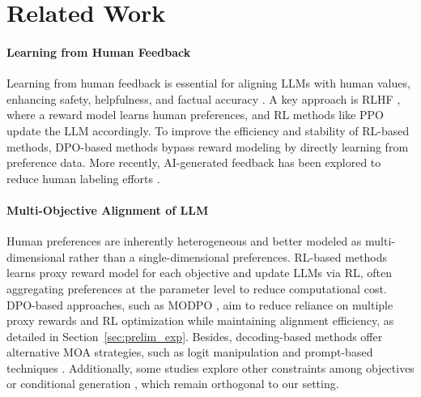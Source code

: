 \section{Related Work}

\paragraph{Learning from Human Feedback}
Learning from human feedback is essential for aligning LLMs with human values, enhancing safety, helpfulness, and factual accuracy \cite{DBLP:conf/nips/JiLDPZB0SW023, DBLP:conf/naacl/WangDZASEDSKSK24, DBLP:conf/nips/LinGOXLY024, DBLP:conf/icml/CuiY0YH0NXXL0024}. A key approach is RLHF \cite{DBLP:conf/nips/Ouyang0JAWMZASR22, DBLP:conf/nips/StiennonO0ZLVRA20, DBLP:journals/corr/abs-2204-05862, DBLP:journals/corr/abs-2307-09288}, where a reward model learns human preferences, and RL methods like PPO \cite{DBLP:journals/corr/SchulmanWDRK17} update the LLM accordingly. To improve the efficiency and stability of RL-based methods, DPO-based methods \cite{DBLP:conf/nips/RafailovSMMEF23, DBLP:journals/corr/abs-2402-01306, DBLP:conf/iclr/WangJYLC24, DBLP:conf/aistats/AzarGPMRVC24} bypass reward modeling by directly learning from preference data. More recently, AI-generated feedback has been explored to reduce human labeling efforts \cite{DBLP:conf/icml/0001PMMFLBHCRP24, DBLP:journals/corr/abs-2411-16646}.


\paragraph{Multi-Objective Alignment of LLM}
Human preferences are inherently heterogeneous and better modeled as multi-dimensional rather than a single-dimensional preferences.
RL-based methods \cite{DBLP:conf/nips/RameCDGSSC23, DBLP:journals/corr/abs-2310-11564, DBLP:conf/nips/ZhongMZYC0Q024, DBLP:conf/acl/WangLXYDQZZ24, DBLP:conf/emnlp/WangKSADMGLGDRF24} learns proxy reward model for each objective and update LLMs via RL, often aggregating preferences at the parameter level to reduce computational cost.
DPO-based approaches, such as MODPO \cite{DBLP:conf/acl/ZhouLS00O024}, aim to reduce reliance on multiple proxy rewards and RL optimization while maintaining alignment efficiency, as detailed in Section~\ref{sec:prelim_exp}. 
Besides, decoding-based methods offer alternative MOA strategies, such as logit manipulation \cite{DBLP:conf/nips/ShiCHLHSD24, DBLP:conf/emnlp/LiuZWYQ24, DBLP:journals/corr/abs-2410-08193, chen2025pad} and prompt-based techniques \cite{DBLP:journals/corr/abs-2408-05094}.
Additionally, some studies explore other constraints among objectives \cite{DBLP:journals/corr/abs-2403-02475, DBLP:journals/corr/abs-2408-15313} or conditional generation \cite{DBLP:conf/emnlp/GuoCY0SSCXZL0024, DBLP:conf/icml/0010PLQ00C24, DBLP:journals/corr/abs-2410-08316}, which remain orthogonal to our setting.

